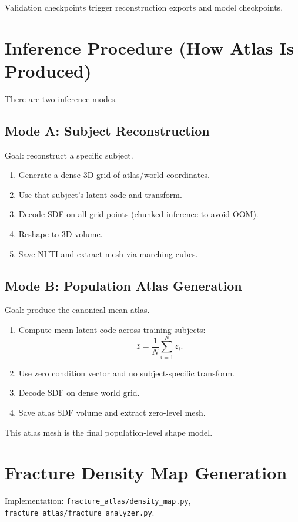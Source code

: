 ﻿\documentclass[11pt]{article}
\begin{document}
Validation checkpoints trigger reconstruction exports and model checkpoints.

\section{Inference Procedure (How Atlas Is Produced)}
There are two inference modes.

\subsection{Mode A: Subject Reconstruction}
Goal: reconstruct a specific subject.
\begin{enumerate}[leftmargin=*]
    \item Generate a dense 3D grid of atlas/world coordinates.
    \item Use that subject's latent code and transform.
    \item Decode SDF on all grid points (chunked inference to avoid OOM).
    \item Reshape to 3D volume.
    \item Save NIfTI and extract mesh via marching cubes.
\end{enumerate}

\subsection{Mode B: Population Atlas Generation}
Goal: produce the canonical mean atlas.
\begin{enumerate}[leftmargin=*]
    \item Compute mean latent code across training subjects:
    \begin{equation}
    \bar{z}=\frac{1}{N}\sum_{i=1}^{N} z_i.
    \end{equation}
    \item Use zero condition vector and no subject-specific transform.
    \item Decode SDF on dense world grid.
    \item Save atlas SDF volume and extract zero-level mesh.
\end{enumerate}

This atlas mesh is the final population-level shape model.

\section{Fracture Density Map Generation}
Implementation: \texttt{fracture\_atlas/density\_map.py}, \texttt{fracture\_atlas/fracture\_analyzer.py}.
\end{document}
